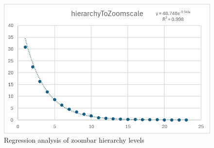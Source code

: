 \begin{figure}
\includegraphics[width=1\linewidth]{docs/material/ZoomBar_Regression.png} 
\caption{Regression analysis of zoombar hierarchy levels}\label{zoombar/hierarchyLevelPicture}
\end{figure}

